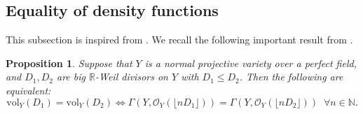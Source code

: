 \documentclass[12pt,a4paper]{amsart}
\theoremstyle{plain}
\newtheorem{proposition}[theorem]{Proposition}
\theoremstyle{definition}
\numberwithin{equation}{theorem}
\begin{document}
\subsection{Equality of density functions}

This subsection is inspired from \cite{DRT26}. We recall the following important result from \cite{FKL16}.

\begin{proposition}\cite[Theorem B]{FKL16}\label{equality_volumes}
 Suppose that $Y$ is a normal projective variety over a perfect field, and $D_1,D_2$ are big $\mathbb{R}$-Weil divisors on $Y$ with $D_1\leq D_2$. Then the following are equivalent: $$\mathrm{vol}_Y(D_1) = \mathrm{vol}_Y(D_2) \iff \Gamma\left(Y,\mathcal{O}_Y\left(\lfloor nD_1\rfloor\right)\right) = \Gamma\left(Y,\mathcal{O}_Y\left(\lfloor nD_2\rfloor\right)\right)\;\; \forall n\in\mathbb{N}.$$
\end{proposition}
\end{document}
